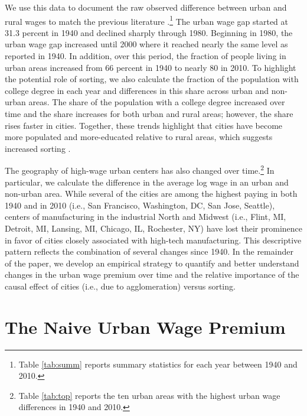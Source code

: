 \documentclass[12pt]{article}
\begin{document}
We use this data to document the raw observed difference between urban and rural wages to match the previous literature \citep*{moretti2013real,Boustan_Bunten_Hearey_2013}.\footnote{Table \ref{tab:summ} reports summary statistics for each year between 1940 and 2010.}
The urban wage gap started at 31.3 percent in 1940 and declined sharply through 1980.
Beginning in 1980, the urban wage gap increased until 2000 where it reached nearly the same level as reported in 1940.
In addition, over this period, the fraction of people living in urban areas increased from  66 percent in 1940 to nearly 80 in 2010.
To highlight the potential role of sorting, we also calculate the fraction of the population with college degree in each year and differences in this share across urban and non-urban areas.
The share of the population with a college degree increased over time and the share increases for both urban and rural areas; however, the share rises faster in cities.
Together, these trends highlight that cities have become more populated and more-educated relative to rural areas, which suggests increased sorting \citep{glaeser2003rise, diamond2021spatial}.

The geography of high-wage urban centers has also changed over time.\footnote{Table \ref{tab:top} reports the ten urban areas with the highest urban wage differences in 1940 and 2010.}
In particular, we calculate the difference in the average log wage in an urban and non-urban area.
While several of the cities are among the highest paying in both 1940 and in 2010 (i.e., San Francisco, Washington, DC, San Jose, Seattle), centers of manufacturing in the industrial North and Midwest (i.e., Flint, MI, Detroit, MI, Lansing, MI, Chicago, IL, Rochester, NY) have lost their prominence in favor of cities closely associated with high-tech manufacturing.
This descriptive pattern reflects the combination of several changes since 1940.
In the remainder of the paper, we develop an empirical strategy to quantify and better understand changes in the urban wage premium over time and the relative importance of the causal effect of cities (i.e., due to agglomeration) versus sorting. 

\section{The Naive Urban Wage Premium}
\end{document}
